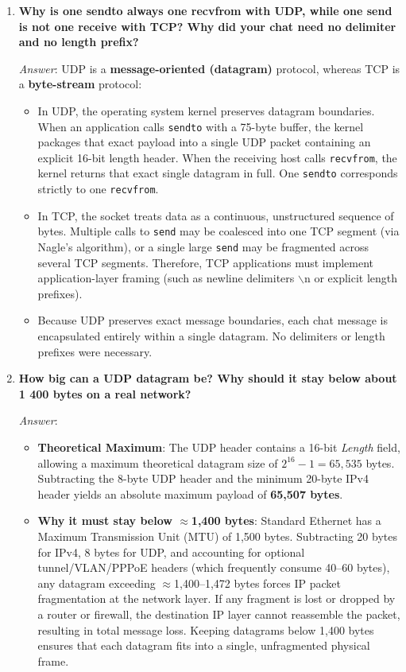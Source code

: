 \documentclass[11pt,a4paper]{article}
\begin{document}
\begin{enumerate}[label=\textbf{Control Question \arabic*:}, leftmargin=*]
    \item \textbf{Why is one sendto always one recvfrom with UDP, while one send is not one receive with TCP? Why did your chat need no delimiter and no length prefix?}
    
    \textit{Answer}: UDP is a \textbf{message-oriented (datagram)} protocol, whereas TCP is a \textbf{byte-stream} protocol:
    \begin{itemize}[noitemsep]
        \item In UDP, the operating system kernel preserves datagram boundaries. When an application calls \texttt{sendto} with a 75-byte buffer, the kernel packages that exact payload into a single UDP packet containing an explicit 16-bit length header. When the receiving host calls \texttt{recvfrom}, the kernel returns that exact single datagram in full. One \texttt{sendto} corresponds strictly to one \texttt{recvfrom}.
        \item In TCP, the socket treats data as a continuous, unstructured sequence of bytes. Multiple calls to \texttt{send} may be coalesced into one TCP segment (via Nagle's algorithm), or a single large \texttt{send} may be fragmented across several TCP segments. Therefore, TCP applications must implement application-layer framing (such as newline delimiters $\backslash\text{n}$ or explicit length prefixes).
        \item Because UDP preserves exact message boundaries, each chat message is encapsulated entirely within a single datagram. No delimiters or length prefixes were necessary.
    \end{itemize}

    \item \textbf{How big can a UDP datagram be? Why should it stay below about 1 400 bytes on a real network?}
    
    \textit{Answer}: 
    \begin{itemize}[noitemsep]
        \item \textbf{Theoretical Maximum}: The UDP header contains a 16-bit \textit{Length} field, allowing a maximum theoretical datagram size of $2^{16} - 1 = 65,535$ bytes. Subtracting the 8-byte UDP header and the minimum 20-byte IPv4 header yields an absolute maximum payload of \textbf{65,507 bytes}.
        \item \textbf{Why it must stay below $\approx$1,400 bytes}: Standard Ethernet has a Maximum Transmission Unit (MTU) of 1,500 bytes. Subtracting 20 bytes for IPv4, 8 bytes for UDP, and accounting for optional tunnel/VLAN/PPPoE headers (which frequently consume 40--60 bytes), any datagram exceeding $\approx$1,400--1,472 bytes forces IP packet fragmentation at the network layer. If any fragment is lost or dropped by a router or firewall, the destination IP layer cannot reassemble the packet, resulting in total message loss. Keeping datagrams below 1,400 bytes ensures that each datagram fits into a single, unfragmented physical frame.
    \end{itemize}


\end{enumerate}
\end{document}
